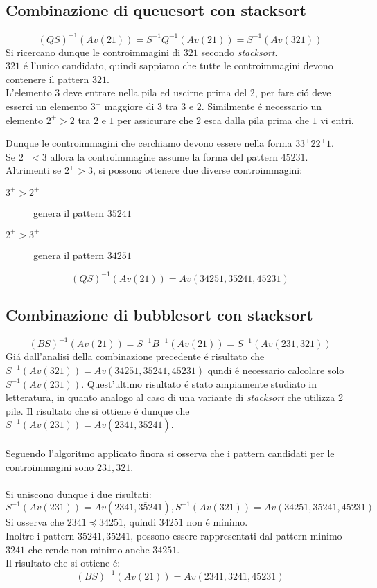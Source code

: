 \subsection*{Combinazione di {queuesort} con {stacksort}}
$$(QS)^{-1}(Av(21))=S^{-1}Q^{-1}(Av(21))=S^{-1}(Av(321))$$
Si ricercano dunque le controimmagini di $321$ secondo \textit{stacksort}.\\$321$ \'e l'unico candidato, quindi sappiamo che tutte le controimmagini devono contenere il pattern $321$.\\
L'elemento $3$ deve entrare nella pila ed uscirne prima del $2$, per fare ci\'o deve esserci un elemento $3^+$ maggiore di $3$ tra $3$ e $2$. Similmente \'e necessario un elemento $2^+>2$ tra $2$ e $1$ per assicurare che $2$ esca dalla pila prima che $1$ vi entri.\\
\begin{center}
\end{center}
Dunque le controimmagini che cerchiamo devono essere nella forma $33^+22^+1$.\\
Se $2^+<3$ allora la controimmagine assume la forma del pattern $45231$.\\
Altrimenti se $2^+>3$, si possono ottenere due diverse controimmagini:
\begin{description}
	\item[$3^+>2^+$] genera il pattern $35241$
	\item[$2^+>3^+$] genera il pattern $34251$
\end{description}
$$(QS)^{-1}(Av(21)) = Av(34251, 35241, 45231)$$
\subsection*{Combinazione di {bubblesort} con {stacksort}}
$$(BS)^{-1}(Av(21))=S^{-1}B^{-1}(Av(21))=S^{-1}(Av(231,321))$$
Gi\'a dall'analisi della combinazione precedente \'e risultato che $S^{-1}(Av(321))=Av(34251, 35241, 45231)$ qundi \'e necessario calcolare solo $S^{-1}(Av(231))$. Quest'ultimo risultato \'e stato ampiamente studiato in letteratura, in quanto analogo al caso di una variante di \textit{stacksort} che utilizza 2 pile. Il risultato che si ottiene \'e dunque che $S^{-1}(Av(231))=Av(2341, 3\overline{5}241)$\cite{claesson2012sorting}.\\\\
Seguendo l'algoritmo applicato finora si osserva che i pattern candidati per le controimmagini sono $231,321$.\\\\
Si uniscono dunque i due risultati:
$$S^{-1}(Av(231))=Av(2341,3\overline{5}241), S^{-1}(Av(321))=Av(34251, 35241, 45231)$$
Si osserva che $2341\preceq 34251$, quindi $34251$ non \'e minimo.\\
Inoltre i pattern $35241, 3\overline{5}241$, possono essere rappresentati dal pattern minimo $3241$ che rende non minimo anche $34251$.\\Il risultato che si ottiene \'e:$$(BS)^{-1}(Av(21))=Av(2341,3241,45231)$$

